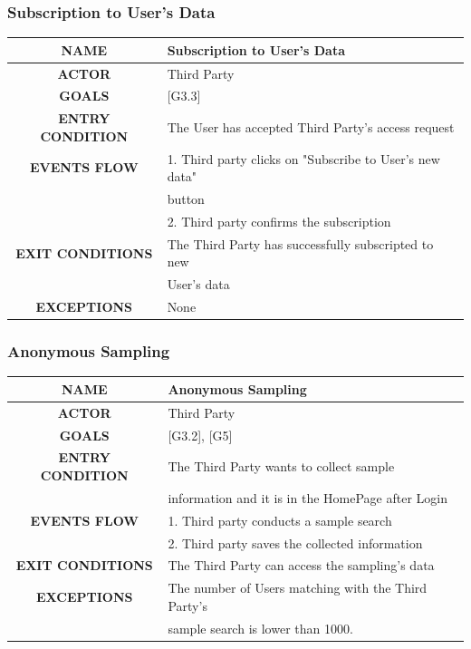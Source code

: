 \documentclass[12pt,a4paper]{article}
\begin{document}
		\newpage
		\subsubsection{Subscription to User's Data}
		\begin{center}
			\begin{tabular}{| c | l |}
				\hline
				\textbf{NAME} & Subscription to User's Data \\
				\hline
				\textbf{ACTOR} & Third Party \\
				\hline
				\textbf{GOALS} & [G3.3] \\
				\hline
				\textbf{ENTRY CONDITION} & The User has accepted Third Party's access request \\ \hline
				\textbf{EVENTS FLOW}  &
				1. Third party clicks on "Subscribe to User's new data" \\ 
				& button\\
				&2. Third party confirms the subscription\\
				\hline
				\textbf{EXIT CONDITIONS}  & The Third Party has successfully subscripted to new\\
				& User's data \\ \hline
				\textbf{EXCEPTIONS} &
				None\\
				\hline
			\end{tabular}
		\end{center}
	
	\subsubsection{Anonymous Sampling}
	\begin{center}
		\begin{tabular}{| c | l |}
			\hline
			\textbf{NAME} & Anonymous Sampling \\
			\hline
			\textbf{ACTOR} & Third Party \\
			\hline
			\textbf{GOALS} & [G3.2], [G5] \\
			\hline
			\textbf{ENTRY CONDITION} & The Third Party wants to collect sample\\ & information and it is in the HomePage after Login \\ 
			\hline
			\textbf{EVENTS FLOW}  &
			1. Third party conducts a sample search\\
			&2. Third party saves the collected information\\
			\hline
			\textbf{EXIT CONDITIONS}  & The Third Party can access the sampling's data\\ \hline
			\textbf{EXCEPTIONS} &
			The number of Users matching with the Third Party's\\
			&sample search is lower than 1000.\\
			\hline
		\end{tabular}
	\end{center}
\end{document}
